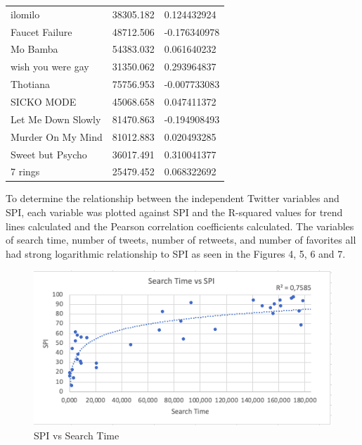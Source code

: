 \documentclass[12pt,conference]{IEEEtran}
\begin{document}
\begin{center}
\begin{small}
{\begin{tabular}{l|l|l}
\centering
ilomilo                         & 38305.182   & 0.124432924  \\
Faucet Failure                  & 48712.506 & -0.176340978 \\
Mo Bamba                        & 54383.032  & 0.061640232  \\
wish you were gay               & 31350.062  & 0.293964837  \\
Thotiana                        & 75756.953 & -0.007733083 \\
SICKO MODE                      & 45068.658 & 0.047411372  \\
Let Me Down Slowly              & 81470.863 & -0.194908493 \\
Murder On My Mind               & 81012.883 & 0.020493285  \\
Sweet but Psycho                & 36017.491 & 0.310041377  \\
7 rings                         & 25479.452 & 0.068322692 
\end{tabular}}
\end{small}
\end{center}

To determine the relationship between the independent Twitter variables and SPI, each variable was plotted against SPI and the R-squared values for trend lines calculated and the Pearson correlation coefficients calculated. The variables of search time, number of tweets, number of retweets, and number of favorites all had strong logarithmic relationship to SPI as seen in the Figures 4, 5, 6 and 7.

\begin{figure}[h!]
  \includegraphics[scale=0.5]{search.png}
  \caption{SPI vs Search Time}
  \label{fig:birds}
\end{figure}
\end{document}
